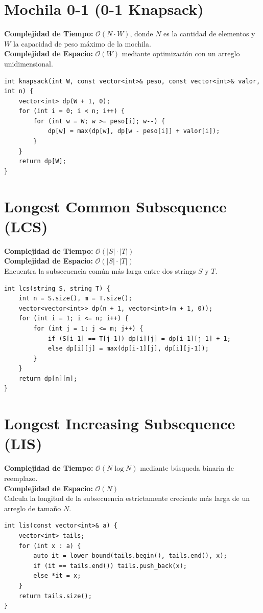 \documentclass[10pt,twocolumn,letterpaper]{report}
\begin{document}
\section{Mochila 0-1 (0-1 Knapsack)}
\textbf{Complejidad de Tiempo:} $\mathcal{O}(N \cdot W)$, donde $N$ es la cantidad de elementos y $W$ la capacidad de peso máximo de la mochila. \\
\textbf{Complejidad de Espacio:} $\mathcal{O}(W)$ mediante optimización con un arreglo unidimensional.
\begin{lstlisting}
int knapsack(int W, const vector<int>& peso, const vector<int>& valor, int n) {
    vector<int> dp(W + 1, 0);
    for (int i = 0; i < n; i++) {
        for (int w = W; w >= peso[i]; w--) {
            dp[w] = max(dp[w], dp[w - peso[i]] + valor[i]);
        }
    }
    return dp[W];
}
\end{lstlisting}
\section{Longest Common Subsequence (LCS)}
\textbf{Complejidad de Tiempo:} $\mathcal{O}(|S| \cdot |T|)$ \\
\textbf{Complejidad de Espacio:} $\mathcal{O}(|S| \cdot |T|)$ \\
Encuentra la subsecuencia común más larga entre dos strings $S$ y $T$.
\begin{lstlisting}
int lcs(string S, string T) {
    int n = S.size(), m = T.size();
    vector<vector<int>> dp(n + 1, vector<int>(m + 1, 0));
    for (int i = 1; i <= n; i++) {
        for (int j = 1; j <= m; j++) {
            if (S[i-1] == T[j-1]) dp[i][j] = dp[i-1][j-1] + 1;
            else dp[i][j] = max(dp[i-1][j], dp[i][j-1]);
        }
    }
    return dp[n][m];
}
\end{lstlisting}
\section{Longest Increasing Subsequence (LIS)}
\textbf{Complejidad de Tiempo:} $\mathcal{O}(N \log N)$ mediante búsqueda binaria de reemplazo. \\
\textbf{Complejidad de Espacio:} $\mathcal{O}(N)$ \\
Calcula la longitud de la subsecuencia estrictamente creciente más larga de un arreglo de tamaño $N$.
\begin{lstlisting}
int lis(const vector<int>& a) {
    vector<int> tails;
    for (int x : a) {
        auto it = lower_bound(tails.begin(), tails.end(), x);
        if (it == tails.end()) tails.push_back(x);
        else *it = x;
    }
    return tails.size();
}
\end{lstlisting}
\end{document}
